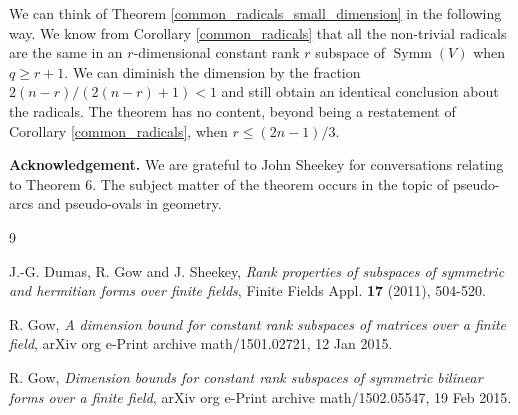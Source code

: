 \documentclass{amsart}
\DeclareMathOperator{\Symm}{Symm}
\theoremstyle{plain}
\theoremstyle{definition}
\begin{document}
We can think of Theorem \ref{common_radicals_small_dimension} in the following way. We know from Corollary \ref{common_radicals}
that all the non-trivial radicals are the same in an $r$-dimensional constant rank $r$ subspace of $\Symm(V)$ when $q\geq r+1$. We can
diminish the dimension by the fraction $2(n-r)/(2(n-r)+1)<1$ and still obtain an identical conclusion about the radicals. The theorem
has no content, beyond being a restatement of Corollary \ref{common_radicals}, when $r\leq (2n-1)/3$.

\bigskip

\noindent\textbf{Acknowledgement.} We are grateful to John Sheekey for conversations relating to Theorem 6. The subject matter of the
theorem occurs in the topic of pseudo-arcs and pseudo-ovals in geometry.






\begin{thebibliography}{9}



 J.-G. Dumas, R. Gow and J. Sheekey, \emph{Rank properties of subspaces of symmetric and hermitian forms over finite fields}, 
Finite Fields Appl. {\bf 17} (2011), 504-520.

\smallskip
{} R. Gow, \emph{A dimension bound for constant rank subspaces of matrices over a finite field}, 
arXiv org e-Print archive math/1501.02721, 12 Jan 2015.


\smallskip

 R. Gow, \emph{Dimension bounds for constant rank subspaces
of symmetric bilinear forms over a finite field}, arXiv org e-Print archive math/1502.05547, 19 Feb 2015.



\end{thebibliography}
\end{document}
